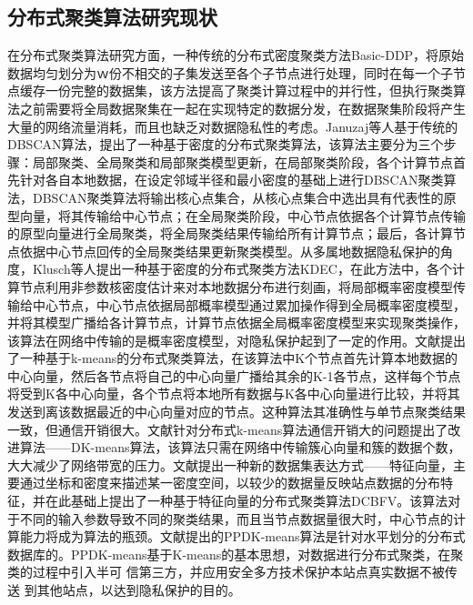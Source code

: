 \subsection{分布式聚类算法研究现状}
在分布式聚类算法研究方面，一种传统的分布式密度聚类方法Basic-DDP，将原始数据均匀划分为ｗ份不相交的子集发送至各个子节点进行处理，同时在每一个子节点缓存一份完整的数据集，该方法提高了聚类计算过程中的并行性，但执行聚类算法之前需要将全局数据聚集在一起在实现特定的数据分发，在数据聚集阶段将产生大量的网络流量消耗，而且也缺乏对数据隐私性的考虑。Januzaj等人基于传统的DBSCAN算法，提出了一种基于密度的分布式聚类算法，该算法主要分为三个步骤：局部聚类、全局聚类和局部聚类模型更新，在局部聚类阶段，各个计算节点首先针对各自本地数据，在设定邻域半径和最小密度的基础上进行DBSCAN聚类算法，DBSCAN聚类算法将输出核心点集合，从核心点集合中选出具有代表性的原型向量，将其传输给中心节点；在全局聚类阶段，中心节点依据各个计算节点传输的原型向量进行全局聚类，将全局聚类结果传输给所有计算节点；最后，各计算节点依据中心节点回传的全局聚类结果更新聚类模型。从多属地数据隐私保护的角度，Klusch等人提出一种基于密度的分布式聚类方法KDEC，在此方法中，各个计算节点利用非参数核密度估计来对本地数据分布进行刻画，将局部概率密度模型传输给中心节点，中心节点依据局部概率模型通过累加操作得到全局概率密度模型，并将其模型广播给各计算节点，计算节点依据全局概率密度模型来实现聚类操作，该算法在网络中传输的是概率密度模型，对隐私保护起到了一定的作用。文献\cite{kantabutra2000parallel}提出了一种基于k-means的分布式聚类算法，在该算法中K个节点首先计算本地数据的中心向量，然后各节点将自己的中心向量广播给其余的K-1各节点，这样每个节点将受到K各中心向量，各个节点将本地所有数据与K各中心向量进行比较，并将其发送到离该数据最近的中心向量对应的节点。这种算法其准确性与单节点聚类结果一致，但通信开销很大。文献\cite{郑苗苗2007DK}针对分布式k-means算法通信开销大的问题提出了改进算法——DK-means算法，该算法只需在网络中传输簇心向量和簇的数据个数，大大减少了网络带宽的压力。文献\cite{李锁花基于特征向量的分布式聚类算法}提出一种新的数据集表达方式——特征向量，主要通过坐标和密度来描述某一密度空间，以较少的数据量反映站点数据的分布特征，并在此基础上提出了一种基于特征向量的分布式聚类算法DCBFV。该算法对于不同的输入参数导致不同的聚类结果，而且当节点数据量很大时，中心节点的计算能力将成为算法的瓶颈。文献\cite{姚瑶一种基于隐私保护的分布式聚类算法}提出的PPDK-means算法是针对水平划分的分布式数据库的。PPDK-means基于K-means的基本思想，对数据进行分布式聚类，在聚类的过程中引入半可 信第三方，并应用安全多方技术保护本站点真实数据不被传送 到其他站点，以达到隐私保护的目的。

